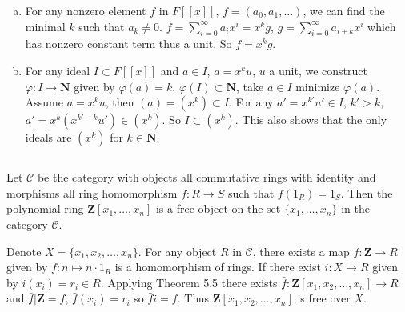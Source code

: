 \begin{answer}
    \begin{enumerate}[(a)]
        \item For any nonzero element $f$ in $F[[x]]$, $f=(a_{0},a_{1},\dots)$, we can find the minimal $k$ such that $a_{k}\neq 0$. $f=\sum\limits_{i=0}^{\infty}a_{i}x^{i}=x^{k}g$, $g=\sum\limits_{i=0}^{\infty}a_{i+k}x^{i}$ which has nonzero constant term thus a unit. So $f=x^{k}g$.
        \item For any ideal $I\subset F[[x]]$ and $a\in I$, $a=x^{k}u$, $u$ a unit, we construct $\varphi:I\to \mathbf{N}$ given by $\varphi(a)=k$, $\varphi(I)\subset \mathbf{N}$, take $a\in I$ minimize $\varphi(a)$. Assume $a=x^{k}u$, then $(a)=(x^{k})\subset I$. For any $a'=x^{k'}u'\in I$, $k'>k$, $a'=x^{k}(x^{k'-k}u')\in (x^{k})$. So $I\subset (x^{k})$. This also shows that the only ideals are $(x^{k})$ for $k\in\mathbf{N}$.
    \end{enumerate}
\end{answer}

$$ $$

\begin{ex}
    Let $\mathcal{C}$ be the category with objects all commutative rings with identity and morphisms all ring homomorphism $f:R\to S$ such that $f(1_{R})=1_{S}$. Then the polynomial ring $\mathbf{Z}[x_{1},\dots,x_{n}]$ is a free object on the set $\{x_{1},\dots,x_{n}\}$ in the category $\mathcal{C}$.
\end{ex}

\begin{answer}
    Denote $X=\{x_{1},x_{2},\dots,x_{n}\}$. For any object $R$ in $\mathcal{C}$, there exists a map $f:\mathbf{Z}\to R$ given by $f:n\mapsto n\cdot 1_{R}$ is a homomorphism of rings. If there exist $i:X\to R$ given by $i(x_{i})=r_{i}\in R$. Applying Theorem 5.5 there exists $\bar{f}:\mathbf{Z}[x_{1},x_{2},\dots,x_{n}]\to R$ and $\bar{f}|\mathbf{Z}=f$, $\bar{f}(x_{i})=r_{i}$ so $\bar{f}i=f$. Thus $\mathbf{Z}[x_{1},x_{2},\dots,x_{n}]$ is free over $X$.
\end{answer}